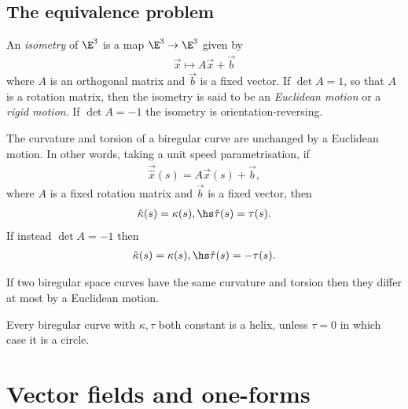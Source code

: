 \documentclass{article}
\begin{document}
\subsection{The equivalence problem}

\begin{definition}
    An \emph{isometry} of $\E^3$ is a map $\E^3\to\E^3$ given by
    \begin{align*}
        \vec x \mapsto A\vec x + \vec b
    \end{align*}
    where $A$ is an orthogonal matrix and $\vec b$ is a fixed vector. If $\det A = 1$,
    so that $A$ is a rotation matrix, then the isometry is said to be an \emph{Euclidean motion}
    or a \emph{rigid motion}. If $\det A = -1$ the isometry is orientation-reversing.
\end{definition}

\begin{proposition}[Notes 3.23]
    The curvature and torsion of a biregular curve are unchanged by a Euclidean motion.
    In other words, taking a unit speed parametrisation, if
    \begin{align*}
        \vec{\hat x}(s) = A\vec x(s) + \vec b,
    \end{align*}
    where $A$ is a fixed rotation matrix and $\vec b$ is a fixed vector, then
    \begin{align*}
        \hat\kappa(s) = \kappa(s), \hs \hat\tau(s)=\tau(s).
    \end{align*}
    If instead $\det A=-1$ then
    \begin{align*}
        \hat\kappa(s)=\kappa(s), \hs \hat\tau(s) = -\tau(s).
    \end{align*}
\end{proposition}

\begin{theorem}
    If two biregular space curves have the same curvature and torsion then they differ at most
    by a Euclidean motion.
\end{theorem}

\begin{corollary}
    Every biregular curve with $\kappa,\tau$ both constant is a helix, unless $\tau=0$ in
    which case it is a circle.
\end{corollary}

\section{Vector fields and one-forms}
\end{document}
